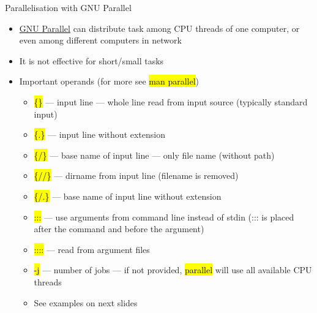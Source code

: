 \documentclass[compress, ucs, xelatex, 11pt, xcolor=svgnames,
  hyperref={
    bookmarks=true,
    unicode=true,
    colorlinks=true,
    pdftitle={Linux, command line and MetaCentrum},
    plainpages=false,
    pdfauthor={Vojtech Zeisek},
    pdfsubject={Course about use of Linux command line, writing shell scripts and using MetaCentrum of CESNET},
    pdfcreator={XeLaTeX},
    pdfkeywords={Linux, GNU, BASH, shell, command line, MetaCentrum},
    linkcolor=DarkRed,
    anchorcolor=DarkBlue,
    citecolor=Indigo,
    filecolor=NavyBlue,
    menucolor=DarkMagenta,
    urlcolor=DarkBlue,
    pdftex},
  url={hyphens, lowtilde} %
  ]{beamer}
\renewcommand{\texttt}[1]{\hl{\ttfamily #1}}
\begin{document}
\begin{frame}{Parallelisation with GNU Parallel}
  \begin{itemize}
    \item \href{https://www.gnu.org/software/parallel/}{GNU Parallel} can distribute task among CPU threads of one computer, or even among different computers in network
    \item It is not effective for short/small tasks
    \item Important operands (for more see \texttt{man parallel})
    \begin{itemize}
      \item \texttt{\{\}} --- input line --- whole line read from input source (typically standard input)
      \item \texttt{\{.\}} --- input line without extension
      \item \texttt{\{/\}} --- base name of input line --- only file name (without path)
      \item \texttt{\{//\}} --- dirname from input line (filename is removed)
      \item \texttt{\{/.\}} --- base name of input line without extension
      \item \texttt{:::} --- use arguments from command line instead of stdin (::: is placed after the command and before the argument)
      \item \texttt{::::} --- read from argument files
      \item \texttt{-j} --- number of jobs --- if not provided, \texttt{parallel} will use all available CPU threads
      \item See examples on next slides
    \end{itemize}
  \end{itemize}
\end{frame}
\end{document}
